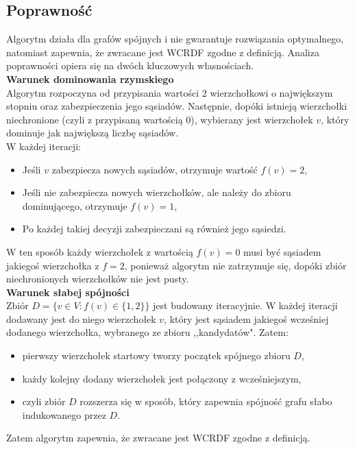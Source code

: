     \subsection{Poprawność}

    Algorytm działa dla grafów spójnych i nie gwarantuje rozwiązania optymalnego, natomiast zapewnia, że zwracane jest WCRDF zgodne z definicją. Analiza poprawności opiera się na dwóch kluczowych własnościach.\\
    \textbf{Warunek dominowania rzymskiego}\\
    Algorytm rozpoczyna od przypisania wartości 2 wierzchołkowi o największym stopniu oraz zabezpieczenia jego sąsiadów. Następnie, dopóki istnieją wierzchołki niechronione (czyli z przypisaną wartością 0), wybierany jest wierzchołek $v$, który dominuje jak największą liczbę sąsiadów.\\
    W każdej iteracji:
    \begin{itemize}
        \item Jeśli $v$ zabezpiecza nowych sąsiadów, otrzymuje wartość $f(v) = 2$,
        \item Jeśli nie zabezpiecza nowych wierzchołków, ale należy do zbioru dominującego, otrzymuje $f(v) = 1$,
        \item Po każdej takiej decyzji zabezpieczani są również jego sąsiedzi.
    \end{itemize}

    W ten sposób każdy wierzchołek z wartością $f(v) = 0$ musi być sąsiadem jakiegoś wierzchołka z $f = 2$, ponieważ algorytm nie zatrzymuje się, dopóki zbiór niechronionych wierzchołków nie jest pusty.\\
    \textbf{Warunek słabej spójności}\\
    Zbiór $D = \{v \in V : f(v) \in \{1,2\} \}$ jest budowany iteracyjnie. W każdej iteracji dodawany jest do niego wierzchołek $v$, który jest sąsiadem jakiegoś wcześniej dodanego wierzchołka, wybranego ze zbioru ,,kandydatów".
    Zatem:
    \begin{itemize}
        \item pierwszy wierzchołek startowy tworzy początek spójnego zbioru $D$,
        \item każdy kolejny dodany wierzchołek jest połączony z wcześniejszym,
        \item czyli zbiór $D$ rozszerza się w sposób, który zapewnia spójność grafu słabo indukowanego przez $D$.
    \end{itemize}
    Zatem algorytm zapewnia, że zwracane jest WCRDF zgodne z definicją.

